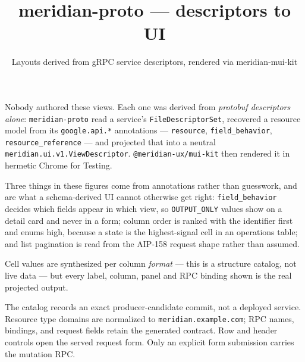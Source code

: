 \documentclass[10pt]{article}
\title{\textbf{meridian-proto} — descriptors to UI}
\author{Layouts derived from gRPC service descriptors, rendered via meridian-mui-kit}
\date{}
\begin{document}
\maketitle

\noindent
Nobody authored these views. Each one was derived from \emph{protobuf descriptors
alone}: \texttt{meridian-proto} read a service's \texttt{FileDescriptorSet},
recovered a resource model from its \texttt{google.api.*} annotations —
\texttt{resource}, \texttt{field\_behavior}, \texttt{resource\_reference} — and
projected that into a neutral \texttt{meridian.ui.v1.ViewDescriptor}.
\texttt{@meridian-ux/mui-kit} then rendered it in hermetic Chrome for Testing.

\medskip
\noindent
Three things in these figures come from annotations rather than guesswork, and are
what a schema-derived UI cannot otherwise get right:
\texttt{field\_behavior} decides which fields appear in which view, so
\texttt{OUTPUT\_ONLY} values show on a detail card and never in a form;
column order is ranked with the identifier first and enums high, because a state is
the highest-signal cell in an operations table; and list pagination is read from the
AIP-158 request shape rather than assumed.

\medskip
\noindent
Cell values are synthesized per column \emph{format} — this is a structure catalog,
not live data — but every label, column, panel and RPC binding shown is the real
projected output.

\medskip
\noindent
The catalog records an exact producer-candidate commit, not a deployed service.
Resource type domains are normalized to \texttt{meridian.example.com}; RPC names,
bindings, and request fields retain the generated contract. Row and header
controls open the served request form. Only an explicit form submission carries
the mutation RPC.


\end{document}
